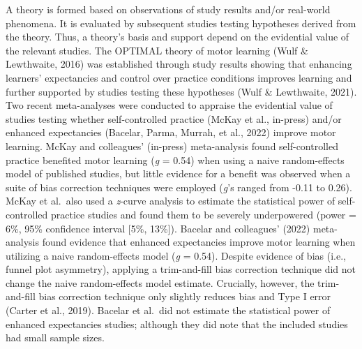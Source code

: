 \documentclass[
  doc, donotrepeattitle,floatsintext]{apa7}
\begin{document}
A theory is formed based on observations of study results and/or real-world phenomena. It is evaluated by subsequent studies testing hypotheses derived from the theory. Thus, a theory's basis and support depend on the evidential value of the relevant studies. The OPTIMAL theory of motor learning (Wulf \& Lewthwaite, 2016) was established through study results showing that enhancing learners' expectancies and control over practice conditions improves learning and further supported by studies testing these hypotheses (Wulf \& Lewthwaite, 2021). Two recent meta-analyses were conducted to appraise the evidential value of studies testing whether self-controlled practice (McKay et al., in-press) and/or enhanced expectancies (Bacelar, Parma, Murrah, et al., 2022) improve motor learning. McKay and colleagues' (in-press) meta-analysis found self-controlled practice benefited motor learning (\emph{g} = 0.54) when using a naive random-effects model of published studies, but little evidence for a benefit was observed when a suite of bias correction techniques were employed (\emph{g}'s ranged from -0.11 to 0.26). McKay et al.~also used a \emph{z}-curve analysis to estimate the statistical power of self-controlled practice studies and found them to be severely underpowered (power = 6\%, 95\% confidence interval {[}5\%, 13\%{]}). Bacelar and colleagues' (2022) meta-analysis found evidence that enhanced expectancies improve motor learning when utilizing a naive random-effects model (\emph{g} = 0.54). Despite evidence of bias (i.e., funnel plot asymmetry), applying a trim-and-fill bias correction technique did not change the naive random-effects model estimate. Crucially, however, the trim-and-fill bias correction technique only slightly reduces bias and Type I error (Carter et al., 2019). Bacelar et al.~did not estimate the statistical power of enhanced expectancies studies; although they did note that the included studies had small sample sizes.
\end{document}
